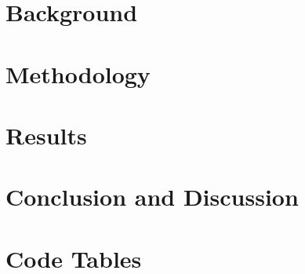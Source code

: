 \documentclass[11pt,leqno]{report}
\begin{document}
\chapter{Background}


\chapter{Methodology}


\chapter{Results}


\chapter{Conclusion and Discussion}


\chapter{Code Tables}



%





\appendix
\end{document}
